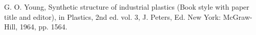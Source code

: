 \begin{thebibliography}{99}
 G. O. Young, Synthetic structure of industrial plastics (Book style with paper title and editor),	in Plastics, 2nd ed. vol. 3, J. Peters, Ed.  New York: McGraw-Hill, 1964, pp. 1564.
\end{thebibliography}
